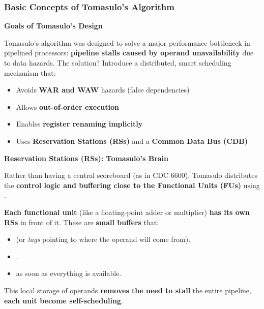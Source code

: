 \subsubsection{Basic Concepts of Tomasulo's Algorithm}

\begin{flushleft}
    \textcolor{Green3}{ \textbf{Goals of Tomasulo's Design}}
\end{flushleft}
Tomasulo's algorithm was designed to solve a major performance bottleneck in pipelined processors: \textbf{pipeline stalls caused by operand unavailability} due to data hazards. The solution? Introduce a distributed, smart scheduling mechanism that:
\begin{itemize}
    \item Avoids \textbf{WAR and WAW} hazards (false dependencies)
    \item Allows \textbf{out-of-order execution}
    \item Enables \textbf{register renaming implicitly}
    \item Uses \textbf{Reservation Stations (RSs)} and a \textbf{Common Data Bus (CDB)}
\end{itemize}

\highspace
\begin{flushleft}
    \textcolor{Green3}{ \textbf{Reservation Stations (RSs): Tomasulo's Brain}}
\end{flushleft}
Rather than having a central scoreboard (as in CDC 6600), Tomasulo distributes the \textbf{control logic and buffering close to the Functional Units (FUs)} using .

\highspace
\textbf{Each functional unit} (like a floating-point adder or multiplier) \textbf{has its own RSs} in front of it. These are \textbf{small buffers} that:
\begin{itemize}
    \item {} (or \emph{tags} pointing to where the operand will come from).
    \item {}.
    \item {} as soon as everything is available.
\end{itemize}
This local storage of operands \textbf{removes the need to stall} the entire pipeline, \textbf{each unit become self-scheduling}.

